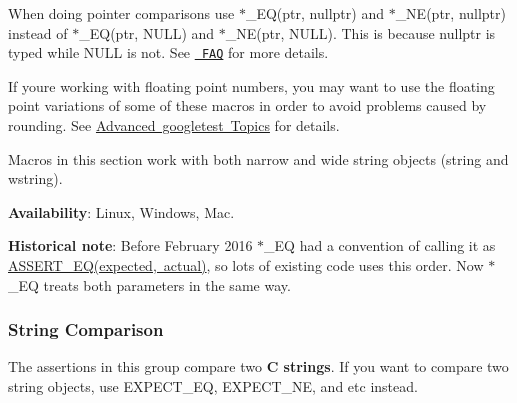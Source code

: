 When doing pointer comparisons use {\ttfamily $\ast$\+\_\+\+EQ(ptr, nullptr)} and {\ttfamily $\ast$\+\_\+\+NE(ptr, nullptr)} instead of {\ttfamily $\ast$\+\_\+\+EQ(ptr, N\+U\+LL)} and {\ttfamily $\ast$\+\_\+\+NE(ptr, N\+U\+LL)}. This is because {\ttfamily nullptr} is typed while {\ttfamily N\+U\+LL} is not. See \href{faq.md\#why-does-google-test-support-expect_eqnull-ptr-and-assert_eqnull-ptr-but-not-expect_nenull-ptr-and-assert_nenull-ptr}{\texttt{ F\+AQ}} for more details.

If you\textquotesingle{}re working with floating point numbers, you may want to use the floating point variations of some of these macros in order to avoid problems caused by rounding. See \mbox{\hyperlink{advanced_8md}{Advanced googletest Topics}} for details.

Macros in this section work with both narrow and wide string objects ({\ttfamily string} and {\ttfamily wstring}).

{\bfseries{Availability}}\+: Linux, Windows, Mac.

{\bfseries{Historical note}}\+: Before February 2016 {\ttfamily $\ast$\+\_\+\+EQ} had a convention of calling it as {\ttfamily \mbox{\hyperlink{gtest_8h_a1a6db8b1338ee7040329322b77779086}{A\+S\+S\+E\+R\+T\+\_\+\+E\+Q(expected, actual)}}}, so lots of existing code uses this order. Now {\ttfamily $\ast$\+\_\+\+EQ} treats both parameters in the same way.

\subsubsection*{String Comparison}

The assertions in this group compare two {\bfseries{C strings}}. If you want to compare two {\ttfamily string} objects, use {\ttfamily E\+X\+P\+E\+C\+T\+\_\+\+EQ}, {\ttfamily E\+X\+P\+E\+C\+T\+\_\+\+NE}, and etc instead.

